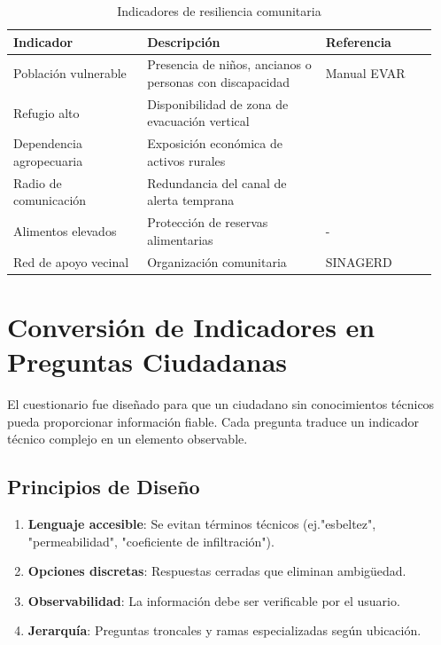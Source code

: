 \documentclass[12pt, letterpaper]{article}
\begin{document}
\begin{table}[H]
\centering
\caption{Indicadores de resiliencia comunitaria}
\label{tab:ind_resiliencia}
\begin{tabular}{@{}p{0.3\linewidth}p{0.4\linewidth}p{0.25\linewidth}@{}}
\toprule
\textbf{Indicador} & \textbf{Descripción} & \textbf{Referencia} \\ \midrule
Población vulnerable & Presencia de niños, ancianos o personas con discapacidad & Manual EVAR \parencite{cenepred_manual_evar} \\
Refugio alto & Disponibilidad de zona de evacuación vertical & \parencite{cenepred_manual_evar} \\
Dependencia agropecuaria & Exposición económica de activos rurales & \parencite{cenepred_manual_evar} \\
Radio de comunicación & Redundancia del canal de alerta temprana & \parencite{cenepred_manual_evar} \\
Alimentos elevados & Protección de reservas alimentarias & - \\
Red de apoyo vecinal & Organización comunitaria & SINAGERD \parencite{cenepred_manual_evar} \\ \bottomrule
\end{tabular}
\end{table}

\section{Conversión de Indicadores en Preguntas Ciudadanas}

El cuestionario fue diseñado para que un ciudadano sin conocimientos técnicos pueda proporcionar información fiable. Cada pregunta traduce un indicador técnico complejo en un elemento observable.

\subsection{Principios de Diseño}

\begin{enumerate}
  \item \textbf{Lenguaje accesible}: Se evitan términos técnicos (ej."esbeltez", "permeabilidad", "coeficiente de infiltración").
  \item \textbf{Opciones discretas}: Respuestas cerradas que eliminan ambigüedad.
  \item \textbf{Observabilidad}: La información debe ser verificable por el usuario.
  \item \textbf{Jerarquía}: Preguntas troncales y ramas especializadas según ubicación.
\end{enumerate}
\end{document}

